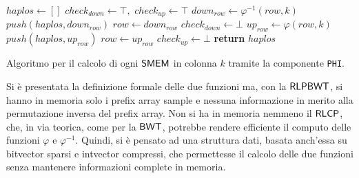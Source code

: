 \begin{algorithm}
  \small
  \begin{algorithmic}[1]
    \State $haplos\gets []$
    \State $check_{down}\gets \top,\,\,check_{up}\gets \top$
    \State $down_{row}\gets \varphi^{-1}(row, k)$
    \State $push(haplos, down_{row})$
    \State $row \gets down_{row}$
    \Else
    \State $check_{down}\gets \bot$
    \EndIf
    \EndWhile
    \State $up_{row}\gets \varphi(row, k)$
    \State $push(haplos, up_{row})$
    \State $row \gets up_{row}$
    \Else
    \State $check_{up}\gets \bot$
    \EndIf
    \EndWhile
    \State \textbf{return} $haplos$
    \EndFunction
  \end{algorithmic}
  \caption{\footnotesize{Algoritmo per il calcolo di ogni $\mbox{\rm {\sf SMEM}}$ in colonna $k$
  tramite la 
  componente \texttt{PHI}.}}
  \label{algo:phiext}
\end{algorithm}
\noindent
Si è presentata la definizione formale delle due funzioni ma, con la $\mbox{\rm {\sf RLPBWT}}$,
si hanno in memoria solo i prefix array sample  e nessuna informazione in merito
alla permutazione inversa del 
prefix array. Non si ha in memoria nemmeno il $\mbox{\rm {\sf RLCP}}$, che, in via teorica, come
per la $\mbox{\rm {\sf BWT}}$, potrebbe rendere efficiente il computo delle funzioni $\varphi$
e $\varphi^{-1}$. Quindi, si è pensato ad una struttura dati, basata
anch'essa su bitvector sparsi e intvector compressi, che permettesse il calcolo
delle due funzioni senza mantenere informazioni complete in memoria. 
